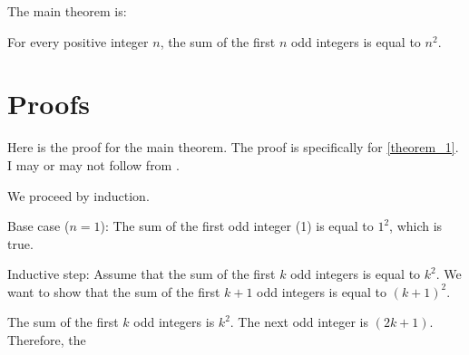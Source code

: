 \documentclass{article}
\begin{document}
The main theorem is:

\begin{theorem}[theorem_1]
\label{theorem_1}
For every positive integer $n$, the sum of the first $n$ odd integers is equal to $n^2$.

\end{theorem}

\section{Proofs}
\label{proofs}
Here is the proof for the main theorem. The proof is specifically for \autoref{theorem_1}. I may or may not follow from \cite{rudelsonSparseReconstructionFourier2008}.

We proceed by induction.

Base case ($n = 1$): The sum of the first odd integer (1) is equal to $1^2$, which is true.

Inductive step: Assume that the sum of the first $k$ odd integers is equal to $k^2$. We want to show that the sum of the first $k+1$ odd integers is equal to $(k+1)^2$.

The sum of the first $k$ odd integers is $k^2$. The next odd integer is $(2k+1)$. Therefore, the


\printbibliography
\end{document}
